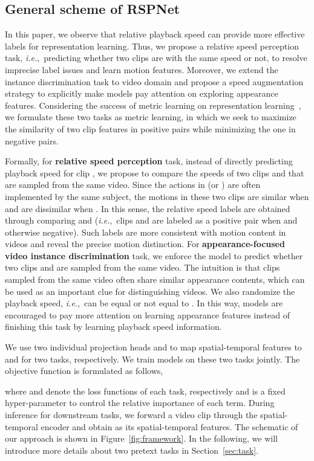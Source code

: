 \documentclass[final]{cvpr}
\def\ie{\mbox{\textit{i.e.}, }}
\begin{document}
\subsection{General scheme of RSPNet}
\label{sec:general_scheme}

In this paper, we observe that relative playback speed can provide more effective labels for representation learning. Thus, we propose a relative speed perception task, \ie predicting whether two clips are with the same speed or not, to resolve imprecise label issues and learn motion features. Moreover, we extend the instance discrimination task to video domain and propose a speed augmentation strategy to explicitly make models pay attention on exploring appearance features.
Considering the success of metric learning on representation learning~\cite{contrastiveloss,He2018scalelr}, we formulate these two tasks as metric learning, in which we seek to maximize the similarity of two clip features in positive pairs while minimizing the one in negative pairs. 

Formally, for \textbf{relative speed perception} task, 
instead of directly predicting playback speed  for clip , we propose to compare the speeds of two clips  and  that are sampled from the same video. 
Since the actions in  (or ) are often implemented by the same subject, the motions in these two clips are similar when  and are dissimilar when .
In this sense, the relative speed labels are obtained through comparing  and  (\ie clips  and  are labeled as a positive pair when  and otherwise negative). Such labels are more consistent with motion content in videos and reveal the precise motion distinction.
For \textbf{appearance-focused video instance discrimination} task, we enforce the model to predict whether two clips  and  are sampled from the same video. The intuition is that clips sampled from the same video often share similar appearance contents, which can be used as an important clue for distinguishing videos.
We also randomize the playback speed, \ie  can be equal or not equal to . In this way, models are encouraged to pay more attention on learning appearance features instead of finishing this task by learning playback speed information.

We use two individual projection heads  and  to map spatial-temporal features  to  and  for two tasks, respectively. We train models on these two tasks jointly. The objective function is formulated as follows,	

where  and  denote the loss functions of each task, respectively and  is a fixed hyper-parameter to control the relative importance of each term. 
During inference for downstream tasks, we forward a video clip through the spatial-temporal encoder  and obtain  as its spatial-temporal features.
The schematic of our approach is shown in Figure~\ref{fig:framework}. In the following, we will introduce more details about two pretext tasks in Section~\ref{sec:task}.
\end{document}
